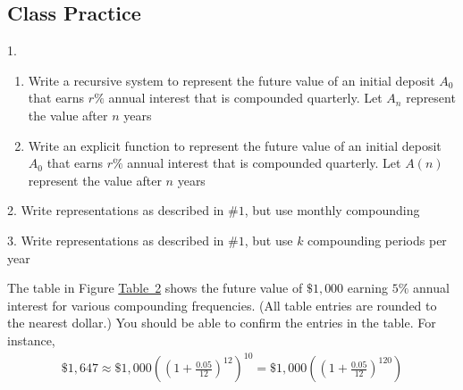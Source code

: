 \documentclass[10pt,]{book}
\theoremstyle{plain}
\theoremstyle{definition}
\theoremstyle{definition}
\theoremstyle{definition}
\numberwithin{equation}{section}
\begin{document}
\subsection[{Class Practice}]{Class Practice}\label{exercises-7}
\begin{exerciselist}
\item[1.]\hypertarget{exercise-47}{}\leavevmode%
\begin{enumerate}[label=(\alph*)]
\item\hypertarget{li-104}{}Write a recursive system to represent the future value of an initial deposit \(A_0\) that earns \(r\%\) annual interest that is compounded quarterly.  Let \(A_n\) represent the value after \(n\) years%
\item\hypertarget{li-105}{}Write an explicit function to represent the future value of an initial deposit \(A_0\) that earns \(r\%\) annual interest that is compounded quarterly.  Let \(A(n)\) represent the value after \(n\) years%
\end{enumerate}
\par\smallskip
\item[2.]\hypertarget{exercise-48}{}Write representations as described in \(\#1\), but use monthly compounding%
\par\smallskip
\item[3.]\hypertarget{exercise-49}{}Write representations as described in \(\#1\), but use \(k\) compounding periods per year%
\par\smallskip
\end{exerciselist}
The table in Figure \hyperref[impact-of-compounding-table]{Table~2} shows the future value of \(\$1,000\) earning \(5\%\) annual interest for various compounding frequencies. (All table entries are rounded to the nearest dollar.) You should be able to confirm the entries in the table.  For instance,%
%
\begin{gather*}
\$1,647 \approx \$1,000 ( ( 1 + \frac{0.05}{12}) ^{12} )^{10} = \$1,000 ( ( 1 + \frac{0.05}{12})^{120})
\end{gather*}
\end{document}
